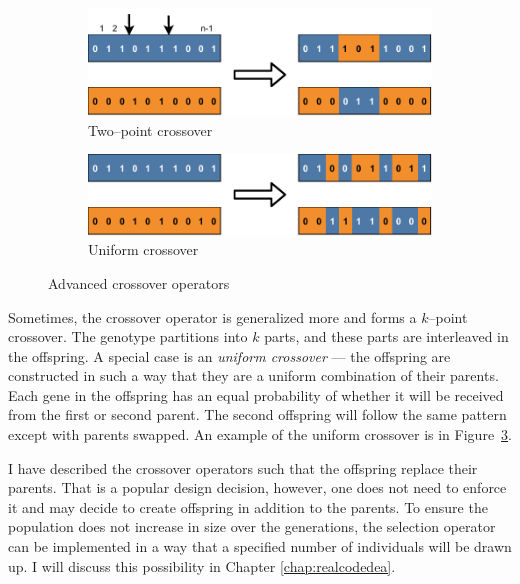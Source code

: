 \begin{figure}
    \begin{subfigure}[b]{0.4\textwidth}
        \includegraphics[width=\textwidth]{img/master_twopointcrossover.pdf}
        \caption{Two--point crossover}
        \label{fig:gatwopointcrossover}
    \end{subfigure}
    \hfill
    \begin{subfigure}[b]{0.4\textwidth}
        \includegraphics[width=\textwidth]{img/master_uniformcrossover.pdf}
        \caption{Uniform crossover}
        \label{fig:uniformcrossover}
    \end{subfigure}
    \caption{Advanced crossover operators}
\end{figure}

Sometimes, the crossover operator is generalized more and forms a \mbox{$k$--point} crossover. The genotype partitions into $k$ parts, and these parts are interleaved in the offspring. A special case is an \emph{uniform crossover} --- the offspring are constructed in such a way that they are a uniform combination of their parents. Each gene in the offspring has an equal probability of whether it will be received from the first or second parent. The second offspring will follow the same pattern except with parents swapped. An example of the uniform crossover is in Figure~\ref{fig:uniformcrossover}.

I have described the crossover operators such that the offspring replace their parents. That is a popular design decision, however, one does not need to enforce it and may decide to create offspring in addition to the parents. To ensure the population does not increase in size over the generations, the selection operator can be implemented in a way that a specified number of individuals will be drawn up. I will discuss this possibility in Chapter \ref{chap:realcodedea}.

